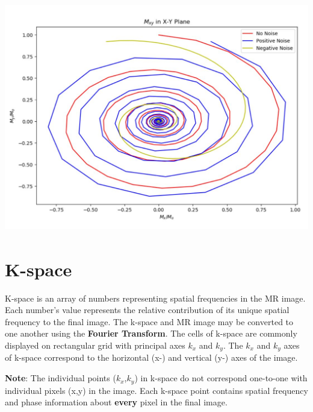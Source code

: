 \documentclass[18pt]{extarticle}
\begin{document}
\begin{center}
	\includegraphics[width=15cm, height=10cm]{mxy}
\end{center}

\section{K-space}
\hspace*{6mm}\large K-space is an array of numbers representing spatial frequencies in the MR image.
Each number's value represents the relative contribution of its unique spatial frequency to the final image.
The k-space and MR image may be converted to one another using the \textbf{Fourier Transform}. The cells of k-space are commonly displayed on rectangular grid with principal axes $k_x$ and $k_y$. The $k_x$ and $k_y$ axes of k-space correspond to the horizontal (x-) and vertical (y-) axes of the image.
\par
\large \textbf{Note}: The individual points ($k_x$,$k_y$) in k-space do not correspond one-to-one with individual pixels (x,y) in the image. Each k-space point contains spatial frequency and phase information about \textbf{every} pixel in the final image.
\end{document}

